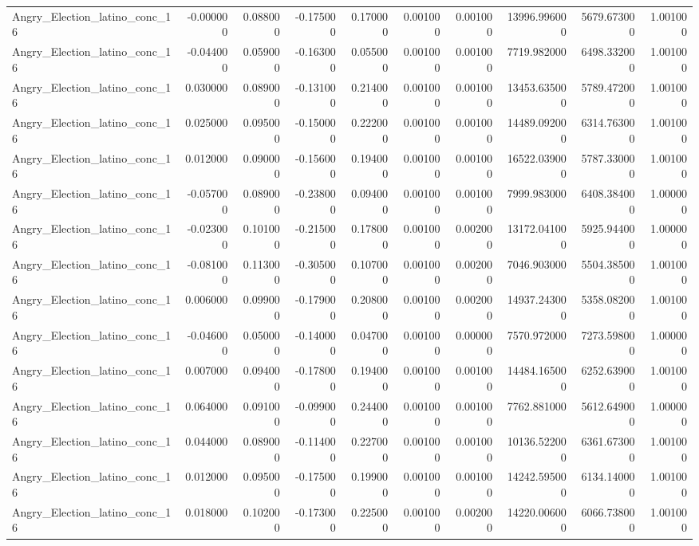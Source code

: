 \begin{table}
\begin{tabular}{lrrrrrrrrr}
Angry_Election_latino_conc_16 & -0.000000 & 0.088000 & -0.175000 & 0.170000 & 0.001000 & 0.001000 & 13996.996000 & 5679.673000 & 1.001000 \\
Angry_Election_latino_conc_16 & -0.044000 & 0.059000 & -0.163000 & 0.055000 & 0.001000 & 0.001000 & 7719.982000 & 6498.332000 & 1.001000 \\
Angry_Election_latino_conc_16 & 0.030000 & 0.089000 & -0.131000 & 0.214000 & 0.001000 & 0.001000 & 13453.635000 & 5789.472000 & 1.001000 \\
Angry_Election_latino_conc_16 & 0.025000 & 0.095000 & -0.150000 & 0.222000 & 0.001000 & 0.001000 & 14489.092000 & 6314.763000 & 1.001000 \\
Angry_Election_latino_conc_16 & 0.012000 & 0.090000 & -0.156000 & 0.194000 & 0.001000 & 0.001000 & 16522.039000 & 5787.330000 & 1.001000 \\
Angry_Election_latino_conc_16 & -0.057000 & 0.089000 & -0.238000 & 0.094000 & 0.001000 & 0.001000 & 7999.983000 & 6408.384000 & 1.000000 \\
Angry_Election_latino_conc_16 & -0.023000 & 0.101000 & -0.215000 & 0.178000 & 0.001000 & 0.002000 & 13172.041000 & 5925.944000 & 1.000000 \\
Angry_Election_latino_conc_16 & -0.081000 & 0.113000 & -0.305000 & 0.107000 & 0.001000 & 0.002000 & 7046.903000 & 5504.385000 & 1.001000 \\
Angry_Election_latino_conc_16 & 0.006000 & 0.099000 & -0.179000 & 0.208000 & 0.001000 & 0.002000 & 14937.243000 & 5358.082000 & 1.001000 \\
Angry_Election_latino_conc_16 & -0.046000 & 0.050000 & -0.140000 & 0.047000 & 0.001000 & 0.000000 & 7570.972000 & 7273.598000 & 1.000000 \\
Angry_Election_latino_conc_16 & 0.007000 & 0.094000 & -0.178000 & 0.194000 & 0.001000 & 0.001000 & 14484.165000 & 6252.639000 & 1.001000 \\
Angry_Election_latino_conc_16 & 0.064000 & 0.091000 & -0.099000 & 0.244000 & 0.001000 & 0.001000 & 7762.881000 & 5612.649000 & 1.000000 \\
Angry_Election_latino_conc_16 & 0.044000 & 0.089000 & -0.114000 & 0.227000 & 0.001000 & 0.001000 & 10136.522000 & 6361.673000 & 1.001000 \\
Angry_Election_latino_conc_16 & 0.012000 & 0.095000 & -0.175000 & 0.199000 & 0.001000 & 0.001000 & 14242.595000 & 6134.140000 & 1.001000 \\
Angry_Election_latino_conc_16 & 0.018000 & 0.102000 & -0.173000 & 0.225000 & 0.001000 & 0.002000 & 14220.006000 & 6066.738000 & 1.001000 \\

\end{tabular}
\end{table}
